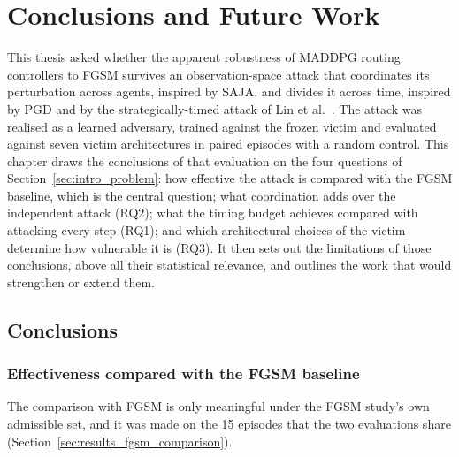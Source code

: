
%

\chapter{Conclusions and Future Work}
\label{cha:conclusions}

This thesis asked whether the apparent robustness of MADDPG routing controllers to FGSM
survives an observation-space attack that coordinates its perturbation across agents,
inspired by SAJA, and divides it across time, inspired by PGD and by the
strategically-timed attack of Lin et al.~\cite{lin2019tacticsadversarialattackdeep}. The
attack was realised
as a learned adversary, trained against the frozen victim and evaluated against seven
victim architectures in paired episodes with a random control. This chapter draws the
conclusions of that evaluation on the four questions of
Section~\ref{sec:intro_problem}: how effective the attack is compared with the FGSM
baseline, which is the central question; what coordination adds over the independent
attack (RQ2); what the timing budget achieves compared with attacking every step (RQ1);
and which architectural choices of the victim determine how vulnerable it is (RQ3). It
then sets out
the limitations of those conclusions, above all their statistical relevance, and
outlines the work that would strengthen or extend them.

\section{Conclusions}
\label{sec:conclusions}

\subsection{Effectiveness compared with the FGSM baseline}
\label{subsec:conclusions_fgsm}

The comparison with FGSM is only meaningful under the FGSM study's own admissible set,
and it was made on the 15 episodes that the two evaluations share
(Section~\ref{sec:results_fgsm_comparison}).

